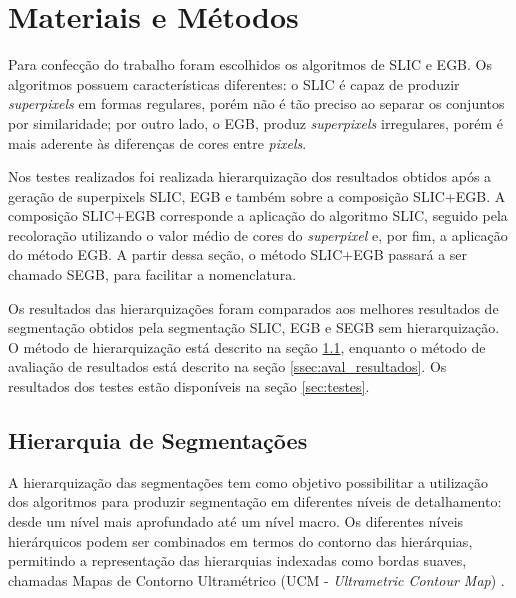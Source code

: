 \begin{document}
\section{Materiais e Métodos} \label{sec:mat_metodos}

Para confecção do trabalho foram escolhidos os algoritmos de SLIC e EGB. Os algoritmos possuem características diferentes: o SLIC é capaz de produzir \textit{superpixels} em formas regulares, porém não é tão preciso ao separar os conjuntos por similaridade; por outro lado, o EGB, produz \textit{superpixels} irregulares, porém é mais aderente às diferenças de cores entre \textit{pixels}.

Nos testes realizados foi realizada hierarquização dos resultados obtidos após a geração de superpixels SLIC, EGB e também sobre a composição SLIC+EGB. A composição SLIC+EGB corresponde a aplicação do algoritmo SLIC, seguido pela recoloração utilizando o valor médio de cores do \textit{superpixel} e, por fim, a aplicação do método EGB. A partir dessa seção, o método SLIC+EGB passará a ser chamado SEGB, para facilitar a nomenclatura.

Os resultados das hierarquizações foram comparados aos melhores resultados de segmentação obtidos pela segmentação SLIC, EGB e SEGB sem hierarquização. O método de hierarquização está descrito na seção \ref{ssec:hierquia_segm}, enquanto o método de avaliação de resultados está descrito na seção \ref{ssec:aval_resultados}. Os resultados dos testes estão disponíveis na seção \ref{sec:testes}.


\subsection{Hierarquia de Segmentações} \label{ssec:hierquia_segm}


A hierarquização das segmentações tem como objetivo possibilitar a utilização dos algoritmos para produzir segmentação em diferentes níveis de detalhamento: desde um nível mais aprofundado até um nível macro. Os diferentes níveis hierárquicos podem ser combinados em termos do contorno das hierárquias, permitindo a representação das hierarquias indexadas como bordas suaves, chamadas Mapas de Contorno Ultramétrico (UCM - \textit{Ultrametric Contour Map}) \cite{ULTRAMETRIC}.
\end{document}
